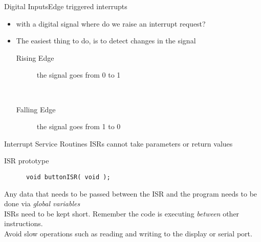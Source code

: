 \documentclass[xcolor=svgnames]{beamer}
\begin{document}
\begin{frame}{Digital Inputs}{Edge triggered interrupts}
\begin{itemize}
  \item with a digital signal where do we raise an interrupt request?\\
    \item The easiest thing to do, is to detect \alert{changes} in the signal
    \begin{description}
      \item[Rising Edge] the signal goes from 0 to 1\\[1em]
      \\[2em]
      \item[Falling Edge]      the signal goes from 1 to 0 \\[1em]

    \end{description}
\end{itemize}
\end{frame}

\begin{frame}[fragile]{Interrupt Service Routines}
\alert{ISR}s cannot take parameters or return values
    \begin{block}{ISR prototype}
    \begin{verbatim}
      void buttonISR( void );
    \end{verbatim}
  \end{block}
  Any data that needs to be passed between the ISR and the program needs to be done
  via \emph{global variables}\\[1em]

\alert{ISR}s need to be kept short.  Remember the code is executing \emph{between} other instructions.\\
\alert{Avoid} slow operations such as reading and writing to the display or serial port.

\end{frame}
\end{document}
